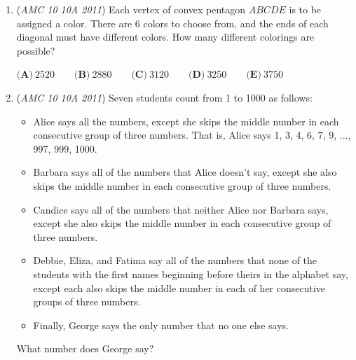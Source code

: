 \begin{enumerate}
 $\textbf{(A)}\ \frac{7}{11}\qquad\textbf{(B)}\ \frac{9}{13}\qquad\textbf{(C)}\ \frac{11}{15}\qquad\textbf{(D)}\ \frac{15}{19}\qquad\textbf{(E)}\ \frac{15}{16}$


	\item (\textit{AMC 10 10A 2011}) Each vertex of convex pentagon $ABCDE$ is to be assigned a color. There are $6$ colors to choose from, and the ends of each diagonal must have different colors. How many different colorings are possible?


 $\textbf{(A)}\ 2520\qquad\textbf{(B)}\ 2880\qquad\textbf{(C)}\ 3120\qquad\textbf{(D)}\ 3250\qquad\textbf{(E)}\ 3750$


	\item (\textit{AMC 10 10A 2011}) Seven students count from 1 to 1000 as follows:


 
            \begin{itemize}
        \item Alice says all the numbers, except she skips the middle number in each consecutive group of three numbers. That is, Alice says 1, 3, 4, 6, 7, 9, ..., 997, 999, 1000.
            \end{itemize}
            
            \begin{itemize}
        \item Barbara says all of the numbers that Alice doesn't say, except she also skips the middle number in each consecutive group of three numbers.
            \end{itemize}
            
            \begin{itemize}
        \item Candice says all of the numbers that neither Alice nor Barbara says, except she also skips the middle number in each consecutive group of three numbers.
            \end{itemize}
            
            \begin{itemize}
        \item Debbie, Eliza, and Fatima say all of the numbers that none of the students with the first names beginning before theirs in the alphabet say, except each also skips the middle number in each of her consecutive groups of three numbers.
            \end{itemize}
            
            \begin{itemize}
        \item Finally, George says the only number that no one else says.
            \end{itemize}
            What number does George say?



\end{enumerate}

